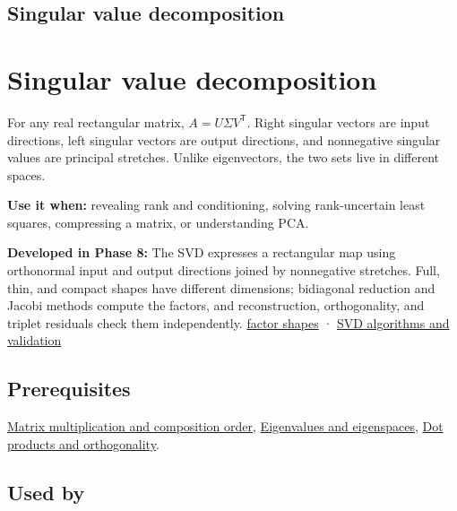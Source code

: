 \hypertarget{appendix-1fad5e7f36fa}{}
\section*{Singular value decomposition}
\chapter{Singular value decomposition}\label{appendix-1fad5e7f36fa-singular-value-decomposition}

For any real rectangular matrix, \(A=U\Sigma V^\mathsf T\). Right singular vectors are input directions, left singular vectors are output directions, and nonnegative singular values are principal stretches. Unlike eigenvectors, the two sets live in different spaces.

\textbf{Use it when:} revealing rank and conditioning, solving rank-uncertain least squares, compressing a matrix, or understanding PCA.

\textbf{Developed in Phase 8:} The SVD expresses a rectangular map using orthonormal input and output directions joined by nonnegative stretches. Full, thin, and compact shapes have different dimensions; bidiagonal reduction and Jacobi methods compute the factors, and reconstruction, orthogonality, and triplet residuals check them independently. \href{Continuous\%20Notes/Computing\%20Foundations\%20-\%20From\%20Bits\%20to\%20C++\%20and\%20Systems\%20APIs\#Full,\%20thin,\%20and\%20compact\%20shapes\%20for\%20tall\%20and\%20wide\%20matrices}{factor shapes} · \href{Continuous\%20Notes/Computing\%20Foundations\%20-\%20From\%20Bits\%20to\%20C++\%20and\%20Systems\%20APIs\#How\%20numerical\%20software\%20computes\%20and\%20checks\%20an\%20SVD}{SVD algorithms and validation}

\section{Prerequisites}\label{appendix-1fad5e7f36fa-prerequisites}

\hyperref[appendix-ab31ef447dbf]{Matrix multiplication and composition order}, \hyperref[appendix-0b3be18411f9]{Eigenvalues and eigenspaces}, \hyperref[appendix-8bc4e8fc547c]{Dot products and orthogonality}.

\section{Used by}\label{appendix-1fad5e7f36fa-used-by}

